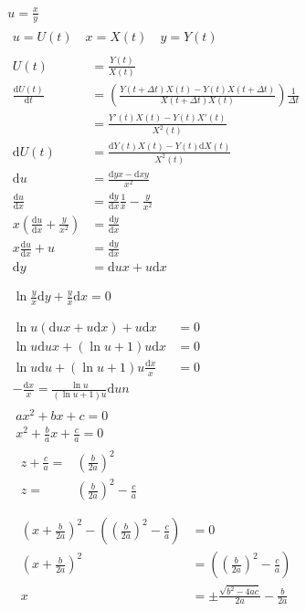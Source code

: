 \documentclass{article}
\newcommand\D[1]{\Delta{#1}}
\newcommand\F[2]{\frac{#1}{#2}}
\newcommand\di[1]{\text{d}#1}74
\begin{document}
  \begin{gather*}
    u = \frac{x}{y} \\
    \begin{gathered}
      u = U(t) \quad x = X(t) \quad y = Y(t)
    \end{gathered} \\
    \begin{aligned}
      U(t) &= \F{Y(t)}{X(t)} \\
      \F{\di{U}(t)}{\di{t}} &= \left( \F{Y(t + \D{t})X(t) - Y(t)X(t + \D{t})}{X(t + \D{t})X(t)} \right) \F{1}{\D{t}} \\
      &= \F{Y'(t)X(t) - Y(t)X'(t)}{X^2(t)} \\
      \di{U}(t) &= \F{\di{Y}(t)X(t) - Y(t)\di{X}(t)}{X^2(t)} \\
      \di{u} & = \F{\di{y}x - \di{x}y}{x^{2}} \\
      \F{\di{u}}{\di{x}} &= \F{\di{y}}{\di{x}}\F{1}{x} - \F{y}{x^2} \\
      x\left( \F{\di{u}}{\di{x}} + \F{y}{x^2} \right) &= \F{\di{y}}{\di{x}} \\
      x\F{\di{u}}{\di{x}} + u &= \F{\di{y}}{\di{x}} \\
      \di{y} &= \di{u}x + u\di{x} \\
    \end{aligned} \\
    \begin{gathered}
      \ln{\F{y}{x}}\di{y} + \F{y}{x}\di{x} = 0 \\
    \end{gathered} \\
    \begin{aligned}
      \ln{u}(\di{u}x + u\di{x}) + u\di{x} &= 0 \\ 
      \ln{u}\di{u}x + ( \ln{u} + 1 ) u\di{x} &= 0 \\
      \ln{u}\di{u} + ( \ln{u} + 1 ) u\F{\di{x}}{x} &= 0 \\
      -\F{\di{x}}{x} = \F{\ln{u}}{\left( \ln{u} + 1 \right)u}\di{u}n
    \end{aligned}
  \end{gather*}
  \begin{gather*}
    ax^{2}+bx+c = 0 \\
    x^{2}+\frac{b}{a}x+\frac{c}{a} = 0 \\
    \begin{aligned}
      z+\frac{c}{a} =& \left(\frac{b}{2a}\right)^{2} \\
      z =& \left(\frac{b}{2a}\right)^{2} - \frac{c}{a} \\
    \end{aligned} \\
    \begin{aligned}
      \left(x + \frac{b}{2a}\right)^{2} - \left( \left(\frac{b}{2a}\right)^{2} - \frac{c}{a} \right) &= 0 \\
      \left(x + \frac{b}{2a}\right)^{2} &= \left( \left(\frac{b}{2a}\right)^{2} - \frac{c}{a} \right) \\
      x &= \pm\frac{\sqrt{b^{2}-4ac}}{2a} - \frac{b}{2a}
    \end{aligned}
  \end{gather*}
\end{document}
